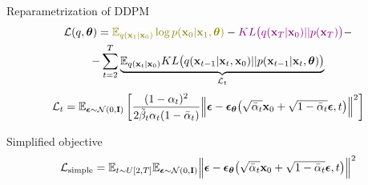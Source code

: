 \begin{frame}{Reparametrization of DDPM}
	\begin{multline*}
		\cL(q, \btheta) =  {\color{olive}\bbE_{q(\bx_1 | \bx_0)} \log p(\bx_0 | \bx_1, \btheta)} - {\color{violet}KL\bigl(q(\bx_T | \bx_0) || p(\bx_T)\bigr)} - \\
		- \sum_{t=2}^T \underbrace{ \bbE_{q(\bx_t | \bx_0)} KL \bigl(q(\bx_{t-1} | \bx_t, \bx_0) || p(\bx_{t - 1} | \bx_t, \btheta )\bigr)}_{\cL_t}
	\end{multline*}
	\vspace{-0.3cm}
	\[
		\mathcal{L}_t  = \mathbb{E}_{\boldsymbol{\epsilon} \sim \mathcal{N}(0, \mathbf{I})} \left[ \frac{(1 - \alpha_t)^2}{2\tilde{\beta}_t \alpha_t (1 - \bar{\alpha}_t)} \Bigl\| \boldsymbol{\epsilon} - \boldsymbol{\epsilon}_{\boldsymbol{\theta}}\bigl( \sqrt{\bar{\alpha}_t} \mathbf{x}_0 + \sqrt{1 - \bar{\alpha}_t} \boldsymbol{\epsilon}, t\bigr) \Bigr\|^2 \right]
	\]
	\begin{block}{Simplified objective}
		\[
			 \mathcal{L}_{\text{simple}} = \mathbb{E}_{t \sim U[2, T]} \mathbb{E}_{\boldsymbol{\epsilon} \sim \mathcal{N}(0, \mathbf{I})} \Bigl\| \boldsymbol{\epsilon} - \boldsymbol{\epsilon}_{\boldsymbol{\theta}}\bigl( \sqrt{\bar{\alpha}_t} \mathbf{x}_0 + \sqrt{1 - \bar{\alpha}_t} \boldsymbol{\epsilon}, t\bigr) \Bigr\|^2 
		\]
	\end{block}
	\end{frame}
